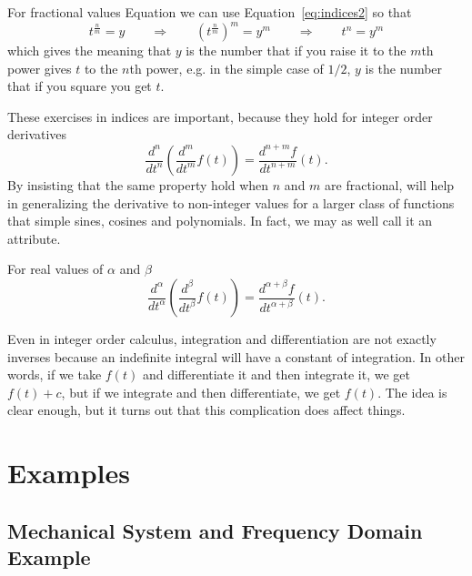 For fractional values Equation we can use Equation~\ref{eq:indices2} so that
\begin{equation}
  t^\frac{n}{m} = y \qquad \Longrightarrow \qquad \left( t^\frac{n}{m} \right)^m = y^m \qquad \Longrightarrow \qquad t^n = y^m
\end{equation}
which gives the meaning that $y$ is the number that if you raise it to the $m$th power gives $t$ to the $n$th power, e.g. in the simple case of $1/2$, $y$ is the number that if you square you get $t$.

These exercises in indices are important, because they hold for integer order derivatives
\begin{equation}
  \frac{d^n}{dt^n} \left( \frac{d^m}{dt^m} f(t) \right) = \frac{d^{n+m}f}{dt^{n+m}}(t).
\end{equation}
By insisting that the same property hold when $n$ and $m$ are fractional, will help in generalizing the derivative to non-integer values for a larger class of functions that simple sines, cosines and polynomials. In fact, we may as well call it an attribute.

\begin{attribute}
  For real values of $\alpha$ and $\beta$
  \begin{equation}
    \frac{d^\alpha}{dt^\alpha} \left( \frac{d^\beta}{dt^\beta} f(t) \right) = \frac{d^{\alpha + \beta}f}{dt^{\alpha + \beta}}(t).
    \label{eq:derivindices}
  \end{equation}
\end{attribute}

Even in integer order calculus, integration and differentiation are not exactly inverses because an indefinite integral will have a constant of integration. In other words, if we take $f(t)$ and differentiate it and then integrate it, we get $f(t) + c$, but if we integrate and then differentiate, we get $f(t)$. The idea is clear enough, but it turns out that this complication does affect things.


\section{Examples}

\subsection{Mechanical System and Frequency Domain Example}

